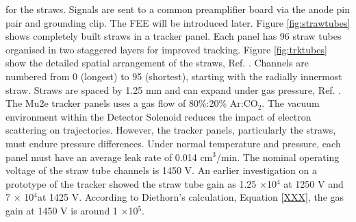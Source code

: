 for the straws. 
Signals are sent to a common preamplifier board via the anode pin pair and grounding clip. 
The FEE will be introduced later. Figure \ref{fig:strawtubes} shows completely built straws in a tracker panel. 
Each panel has 96 straw tubes organised in two staggered layers for improved tracking. Figure \ref{fig:trktubes} 
show the detailed spatial arrangement of the straws, Ref. \cite{trk}. Channels are numbered from 0 (longest) 
to 95 (shortest), starting with the radially innermost straw.
Straws are spaced by 1.25 mm and can expand under gas pressure, Ref. \cite{bartoszek2015mu2e}.
The Mu2e tracker panels uses a gas flow of 80\%:20\% Ar:CO$_2$. 
The vacuum environment within the Detector Solenoid reduces the impact of electron scattering on trajectories. 
However, the tracker panels, particularly the straws, must endure pressure differences. Under normal temperature 
and pressure, each panel must have an average leak rate of 0.014 cm$^3$/min. The nominal operating voltage of 
the straw tube channels is 1450 V. An earlier investigation on a prototype of the tracker showed the straw tube 
gain as 1.25 $\times$10$^4$ at 1250 V and 7 $\times$ 10$^4$at 1425 V. According to Diethorn's calculation, Equation \ref{XXX}, 
the gas gain at 1450 V is around 1 $\times$10$^5$.


